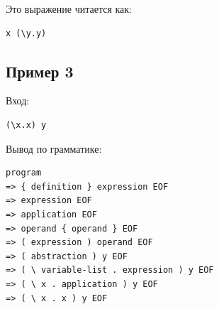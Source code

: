 \documentclass[12pt,a4paper]{article}
\begin{document}
Это выражение читается как:

\begin{lstlisting}[style=grammar]
x (\y.y)
\end{lstlisting}

\subsection*{Пример 3}

Вход:

\begin{lstlisting}[style=grammar]
(\x.x) y
\end{lstlisting}

Вывод по грамматике:

\begin{lstlisting}[style=grammar]
program
=> { definition } expression EOF
=> expression EOF
=> application EOF
=> operand { operand } EOF
=> ( expression ) operand EOF
=> ( abstraction ) y EOF
=> ( \ variable-list . expression ) y EOF
=> ( \ x . application ) y EOF
=> ( \ x . x ) y EOF
\end{lstlisting}
\end{document}
